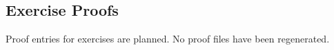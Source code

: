 \subsection*{Exercise Proofs}

Proof entries for exercises are planned. No proof files have been regenerated.
